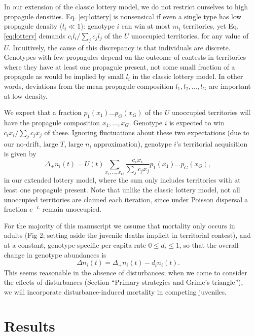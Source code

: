 \documentclass[11pt]{article}
\begin{document}
In our extension of the classic lottery model, we do not restrict ourselves to high propagule densities. Eq. \eqref{eq:lottery} is nonsensical if even a single type has low propagule density ($l_i\ll 1$): genotype $i$ can win at most $m_i$ territories, yet Eq. \eqref{eq:lottery} demands $c_i l_i/\sum_j c_j l_j$ of the $U$ unoccupied territories, for any value of $U$. Intuitively, the cause of this discrepancy is that individuals are discrete. Genotypes with few propagules depend on the outcome of contests in territories where they have at least one propagule present, not some small fraction of a propagule as would be implied by small $l_i$ in the classic lottery model. In other words, deviations from the mean propagule composition $l_1,l_2,\ldots,l_G$ are important at low density. 

We expect that a fraction $p_1(x_1)\ldots p_G(x_G)$ of the $U$ unoccupied territories will have the propagule composition $x_1,\ldots,x_G$. Genotype $i$ is expected to win $c_i x_i/\sum_j c_j x_j$ of these. Ignoring fluctuations about these two expectations (due to our no-drift, large $T$, large $n_i$ approximation), genotype $i$'s territorial acquisition is given by
\begin{equation}
\Delta_+ n_i(t)=U(t)\sum_{x_1,\ldots,x_G} \frac{c_i x_i}{\sum_j c_j x_j} p_1(x_1)\ldots p_G(x_G), \label{eq:growthsumuncoupled}
\end{equation}
in our extended lottery model, where the sum only includes territories with at least one propagule present. Note that unlike the classic lottery model, not all unoccupied territories are claimed each iteration, since under Poisson dispersal a fraction $e^{-L}$ remain unoccupied.

For the majority of this manuscript we assume that mortality only occurs in adults (Fig 2; setting aside the juvenile deaths implicit in territorial contest), and at a constant, genotype-specific per-capita rate $0\leq d_i\leq 1$, so that the overall change in genotype abundances is
\begin{equation}
\Delta n_i(t)=\Delta_+ n_i(t)-d_i n_i(t). \label{eq:delttot}
\end{equation}
This seems reasonable in the absence of disturbances; when we come to consider the effects of disturbances (Section ``Primary strategies and Grime's triangle''), we will incorporate disturbance-induced mortality in competing juveniles.   

\section*{Results}
\end{document}
